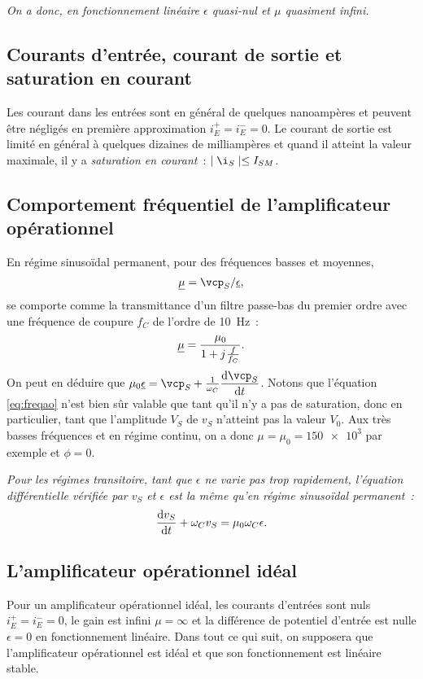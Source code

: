 \emph{On a donc, en fonctionnement linéaire $\epsilon$ quasi-nul et $\mu$ quasiment infini.}
\subsection{Courants d'entrée, courant de sortie et saturation en courant}
Les courant dans les entrées sont en général de quelques nanoampères et peuvent être négligés en première approximation $i_E^+ = i_E^-=0$. Le courant de sortie est limité en général à quelques dizaines de milliampères et quand il atteint la valeur maximale, il y  a \emph{saturation en courant}~: $\mid \i_S \mid \leq I_{SM}$.
\subsection{Comportement fréquentiel de l'amplificateur opérationnel}
En régime sinusoïdal permanent, pour des fréquences basses et moyennes, 
\begin{equation}
	\label{eq:freqao}
	\ncomplexe{\mu} = \vcp_S / \ncomplexe{\epsilon},
\end{equation}
se comporte comme la transmittance d'un filtre passe-bas du premier ordre avec une fréquence de coupure $f_C$ de l'ordre de \SI{10}{\hertz}~:
\begin{equation}
	\underline{\mu} = \frac{\mu_0}{1+{j\mkern1mu} \frac{f}{f_C}}.
\end{equation}
On peut en déduire que $ \mu_0 \ncomplexe{\epsilon} = \vcp_S + \frac{1}{\omega_C} \derived{\vcp_S}{t}$. Notons que l'équation \eqref{eq:freqao} n'est bien sûr valable que tant qu'il n'y a pas de saturation, donc en particulier, tant que l'amplitude $V_S$ de $v_S$ n'atteint pas la valeur $V_0$. Aux très basses fréquences et en régime continu, on a donc $\mu = \mu_0 = \num{150e3}$ par exemple et $\phi=0$.

\emph{Pour les régimes transitoire, tant que $\epsilon$ ne varie pas trop rapidement, l'équation différentielle vérifiée par $v_S$ et $\epsilon$ est la même qu'en régime sinusoïdal permanent~:}
\begin{equation}
	\label{eq:equadiffaop}
	\dfrac{\mathrm{d} v_S}{\mathrm{d} t} + \omega_C v_S = \mu_0 \omega_C \epsilon.
\end{equation} 

\subsection{L'amplificateur opérationnel idéal}
Pour un amplificateur opérationnel idéal, les courants d'entrées sont nuls $i_E^+ = i_E^-=0$, le gain est infini $\mu = \infty$ et la différence de potentiel d'entrée est nulle $\epsilon=0$ en fonctionnement linéaire. %
Dans tout ce qui suit, on supposera que l'amplificateur opérationnel est idéal et que son fonctionnement est linéaire stable.

